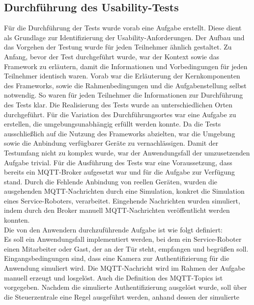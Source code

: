     \subsection{Durchführung des Usability-Tests}
        Für die Durchführung der Tests wurde vorab eine Aufgabe erstellt. Diese 
        dient als Grundlage zur Identifizierung der Usability-Anforderungen. Der Aufbau und das Vorgehen der Testung wurde für jeden Teilnehmer 
        ähnlich gestaltet. Zu Anfang, bevor der Test durchgeführt wurde, war der Kontext sowie das Framework zu erläutern, damit 
        die Informationen und Vorbedingungen für jeden Teilnehmer identisch waren. Vorab war die Erläuterung der 
        Kernkomponenten des Frameworks, sowie die Rahmenbedingungen und die Aufgabenstellung selbst notwendig. So waren für jeden Teilnehmer 
        die Informationen zur Durchführung des Tests klar. Die Realisierung des Tests wurde 
        an unterschiedlichen Orten durchgeführt. Für die Variation des Durchführungsortes war eine Aufgabe zu erstellen, die umgebungsunabhängig 
        erfüllt werden konnte. Da die Tests ausschließlich auf die Nutzung des Frameworks abzielten, war die Umgebung sowie die 
        Anbindung verfügbarer Geräte zu vernachlässigen. Damit der Testumfang nicht zu komplex wurde, war der Anwendungsfall der 
        umzusetzenden Aufgabe trivial. Für die Ausführung des Tests war eine Voraussetzung, dass bereits ein \acs{MQTT}-Broker 
        aufgesetzt war und für die Aufgabe zur Verfügung stand. Durch die Fehlende Anbindung von reellen Geräten, wurden die ausgehenden 
        \acs{MQTT}-Nachrichten durch eine Simulation, konkret die Simulation eines Service-Roboters, verarbeitet. Eingehende Nachrichten 
        wurden simuliert, indem durch den Broker manuell \acs{MQTT}-Nachrichten veröffentlicht werden konnten.
        \\
        Die von den Anwendern durchzuführende Aufgabe ist wie folgt definiert: 
        \\
        \linebreak
        Es soll ein Anwendungsfall implementiert werden, bei dem ein Service-Roboter einen Mitarbeiter oder Gast, der an der Tür steht, 
        empfangen und begrüßen soll. Eingangsbedingungen sind, dass eine Kamera zur Authentifizierung für die Anwendung simuliert wird. 
        Die \acs{MQTT}-Nachricht wird im Rahmen der Aufgabe manuell erzeugt und losgelöst. Auch die Definition des \acs{MQTT}-Topics ist vorgegeben. 
        Nachdem die simulierte Authentifizierung ausgelöst wurde, soll über die Steuerzentrale eine Regel ausgeführt werden, anhand dessen der simulierte 
